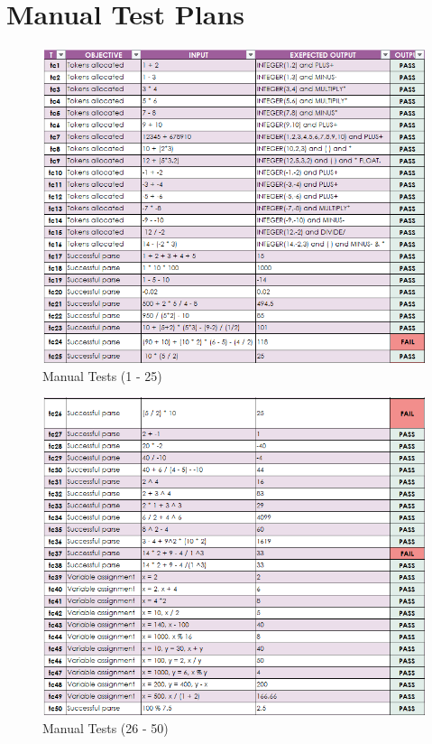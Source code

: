 \documentclass[a4paper, oneside, 11pt]{report}
\begin{document}
\newpage

\section{Manual Test Plans}\label{manual-test}

\begin{figure}[H]
    \centering
    \includegraphics[width=16.0cm]{MathChampTestPlan-A.png}
    \caption{Manual Tests (1 - 25)}
    \label{fig:tests1-25}
\end{figure}
\newpage

\begin{figure}[H]
    \centering
    \includegraphics[width=16.0cm]{MathChampTestPlan-B.png}
    \caption{Manual Tests (26 - 50)}
    \label{fig:tests26-50}
\end{figure}
\newpage
\end{document}
